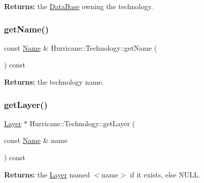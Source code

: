 {\bfseries Returns\+:} the \hyperlink{classHurricane_1_1DataBase}{Data\+Base} owning the technology. \mbox{\label{classHurricane_1_1Technology_ae466071aa1991c853ee71af12fa62d4e}} 
\subsubsection{\texorpdfstring{get\+Name()}{getName()}}
{\footnotesize\ttfamily const \hyperlink{classHurricane_1_1Name}{Name} \& Hurricane\+::\+Technology\+::get\+Name (\begin{DoxyParamCaption}{ }\end{DoxyParamCaption}) const\hspace{0.3cm}{\ttfamily [inline]}}

{\bfseries Returns\+:} the technology name. \mbox{\label{classHurricane_1_1Technology_a4ec69c9f8f6b483885f1900c56a97b61}} 
\subsubsection{\texorpdfstring{get\+Layer()}{getLayer()}\hspace{0.1cm}{\footnotesize\ttfamily [1/2]}}
{\footnotesize\ttfamily \hyperlink{classHurricane_1_1Layer}{Layer} $\ast$ Hurricane\+::\+Technology\+::get\+Layer (\begin{DoxyParamCaption}\item[{const \hyperlink{classHurricane_1_1Name}{Name} \&}]{name }\end{DoxyParamCaption}) const\hspace{0.3cm}{\ttfamily [inline]}}

{\bfseries Returns\+:} the \hyperlink{classHurricane_1_1Layer}{Layer} named {\ttfamily $<$name$>$} if it exists, else {\ttfamily N\+U\+LL}. \mbox{\label{classHurricane_1_1Technology_ab096154ce9485cef02244f0037efd4fb}} 
